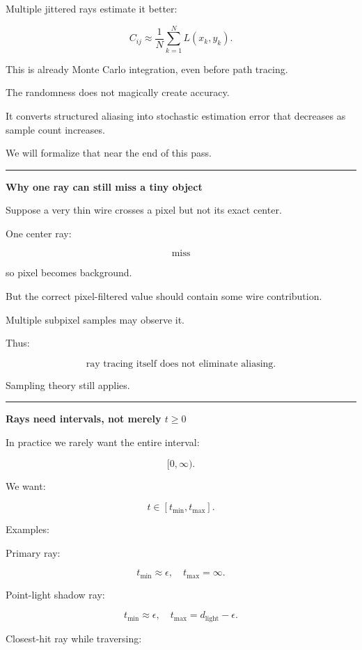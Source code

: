 Multiple jittered rays estimate it better:

\[
\boxed{
C_{ij}
\approx
\frac1N
\sum_{k=1}^{N}
L(x_k,y_k).
}
\]

This is already Monte Carlo integration, even before path tracing.

The randomness does not magically create accuracy.

It converts structured aliasing into stochastic estimation error that decreases as sample count increases.

We will formalize that near the end of this pass.

\begin{center}\rule{0.5\linewidth}{0.5pt}\end{center}

\textbf{Why one ray can still miss a tiny object}

Suppose a very thin wire crosses a pixel but not its exact center.

One center ray:

\[
\text{miss}
\]

so pixel becomes background.

But the correct pixel-filtered value should contain some wire contribution.

Multiple subpixel samples may observe it.

Thus:

\[
\boxed{
\text{ray tracing itself does not eliminate aliasing}.
}
\]

Sampling theory still applies.

\begin{center}\rule{0.5\linewidth}{0.5pt}\end{center}

\textbf{Rays need intervals, not merely \(t\ge0\)}

In practice we rarely want the entire interval:

\[
[0,\infty).
\]

We want:

\[
\boxed{
t\in[t_{\min},t_{\max}].
}
\]

Examples:

Primary ray:

\[
t_{\min}\approx\epsilon,
\quad
t_{\max}=\infty.
\]

Point-light shadow ray:

\[
t_{\min}\approx\epsilon,
\quad
t_{\max}=d_{\text{light}}-\epsilon.
\]

Closest-hit ray while traversing:

